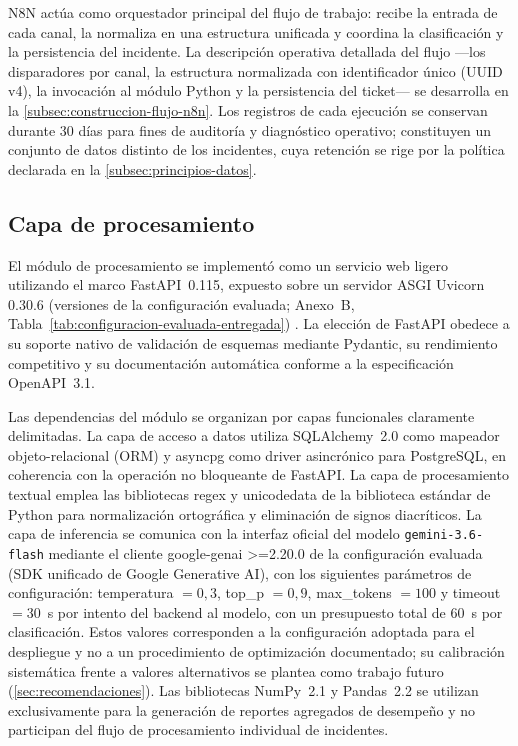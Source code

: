 N8N actúa como orquestador principal del flujo de trabajo: recibe la entrada de cada canal, la normaliza en una estructura unificada y coordina la clasificación y la persistencia del incidente. La descripción operativa detallada del flujo ---los disparadores por canal, la estructura normalizada con identificador único (UUID v4), la invocación al módulo Python y la persistencia del ticket--- se desarrolla en la \autoref{subsec:construccion-flujo-n8n}. Los registros de cada ejecución se conservan durante 30 días para fines de auditoría y diagnóstico operativo; constituyen un conjunto de datos distinto de los incidentes, cuya retención se rige por la política declarada en la \autoref{subsec:principios-datos}.

\subsection{Capa de procesamiento}\label{subsec:capa-procesamiento}

El módulo de procesamiento se implementó como un servicio web ligero utilizando el marco FastAPI~0.115, expuesto sobre un servidor ASGI Uvicorn 0.30.6 (versiones de la configuración evaluada; Anexo~B, Tabla~\ref{tab:configuracion-evaluada-entregada}) \parencite{Tiangolo2024_fastapi}. La elección de FastAPI obedece a su soporte nativo de validación de esquemas mediante Pydantic, su rendimiento competitivo y su documentación automática conforme a la especificación OpenAPI~3.1.

Las dependencias del módulo se organizan por capas funcionales claramente delimitadas. La capa de acceso a datos utiliza SQLAlchemy~2.0 como mapeador objeto-relacional (ORM) y asyncpg como driver asincrónico para PostgreSQL, en coherencia con la operación no bloqueante de FastAPI. La capa de procesamiento textual emplea las bibliotecas regex y unicodedata de la biblioteca estándar de Python para normalización ortográfica y eliminación de signos diacríticos. La capa de inferencia se comunica con la interfaz oficial del modelo \texttt{gemini-3.6-flash} mediante el cliente google-genai >=2.20.0 de la configuración evaluada (SDK unificado de Google Generative AI), con los siguientes parámetros de configuración: temperatura \(= 0{,}3\), top\_p \(= 0{,}9\), max\_tokens \(= 100\) y timeout \(= 30\)~s por intento del backend al modelo, con un presupuesto total de \(60\)~s por clasificación. Estos valores corresponden a la configuración adoptada para el despliegue y no a un procedimiento de optimización documentado; su calibración sistemática frente a valores alternativos se plantea como trabajo futuro (\autoref{sec:recomendaciones}). Las bibliotecas NumPy~2.1 y Pandas~2.2 se utilizan exclusivamente para la generación de reportes agregados de desempeño y no participan del flujo de procesamiento individual de incidentes.

